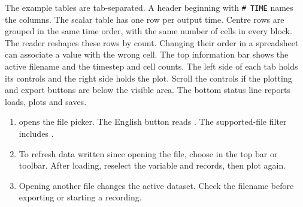 The example tables are tab-separated. A header beginning with \texttt{\# TIME} names the columns. The scalar table has one row per output time. Centre rows are grouped in the same time order, with the same number of cells in every block. The reader reshapes these rows by count. Changing their order in a spreadsheet can associate a value with the wrong cell.
The top information bar shows the active filename and the timestep and cell counts. The left side of each tab holds its controls and the right side holds the plot. Scroll the controls if the plotting and export buttons are below the visible area. The bottom status line reports loads, plots and saves.
\begin{enumerate}
\item {} opens the file picker. The English button reads . The supported-file filter includes .
\item To refresh data written since opening the file, choose  in the top bar or toolbar. After loading, reselect the variable and records, then plot again.
\item Opening another file changes the active dataset. Check the filename before exporting or starting a recording.
\end{enumerate}

